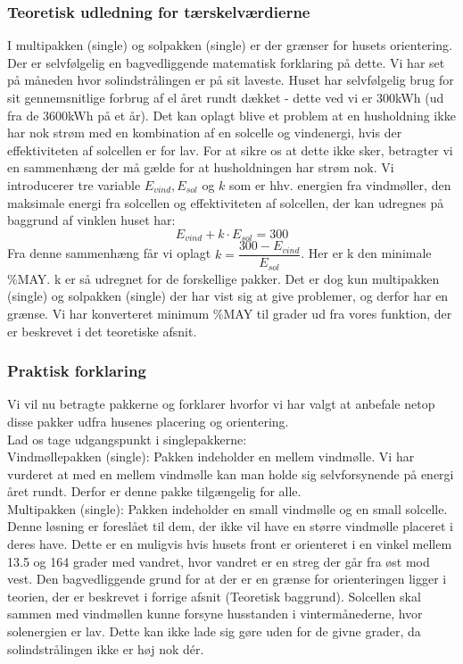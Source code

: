 \documentclass[12pt,a4paper]{article}
\theoremstyle{break}
\theoremstyle{nonumberplain}
\begin{document}
\subsubsection{Teoretisk udledning for tærskelværdierne}

I multipakken (single) og solpakken (single) er der grænser for husets orientering. 
Der er selvfølgelig en bagvedliggende matematisk forklaring på dette. 
Vi har set på måneden hvor solindstrålingen er på sit laveste. Huset har selvfølgelig brug for sit gennemsnitlige forbrug af el året rundt dækket - dette ved vi er 300kWh (ud fra de 3600kWh på et år). 
Det kan oplagt blive et problem at en husholdning ikke har nok strøm med en kombination af en solcelle og vindenergi, hvis der effektiviteten af solcellen er for lav. 
For at sikre os at dette ikke sker, betragter vi en sammenhæng der må gælde for at husholdningen har strøm nok. Vi introducerer tre variable $E_{vind},E_{sol}$ og $k$ som er hhv. energien fra vindmøller, den maksimale energi fra solcellen og effektiviteten af solcellen, der kan udregnes på baggrund af vinklen huset har:
$$E_{vind}+k\cdot E_{sol} = 300$$
Fra denne sammenhæng får vi oplagt
$k = \dfrac{300-E_{vind}}{E_{sol}}$. 
Her er k den minimale \%MAY. k er så udregnet for de forskellige pakker. Det er dog kun multipakken (single) og solpakken (single) der har vist sig at give problemer, og derfor har en grænse. Vi har konverteret minimum \%MAY til grader ud fra vores funktion, der er beskrevet i det teoretiske afsnit.

\subsubsection{Praktisk forklaring}
Vi vil nu betragte pakkerne og forklarer hvorfor vi har valgt at anbefale netop disse pakker udfra husenes placering og orientering. 
\\
Lad os tage udgangspunkt i singlepakkerne:
\\

Vindmøllepakken (single): Pakken indeholder en mellem vindmølle. Vi har vurderet at med en mellem vindmølle kan man holde sig selvforsynende på energi året rundt. Derfor er denne pakke tilgængelig for alle. 
\\

Multipakken (single): Pakken indeholder en small vindmølle og en small solcelle. Denne løsning er foreslået til dem, der ikke vil have en større vindmølle placeret i deres have. Dette er en muligvis hvis husets front er orienteret i en vinkel mellem 13.5 og 164 grader med vandret, hvor vandret er en streg der går fra øst mod vest. Den bagvedliggende grund for at der er en grænse for orienteringen ligger i teorien, der er beskrevet i forrige afsnit (Teoretisk baggrund). Solcellen skal sammen med vindmøllen kunne forsyne husstanden i vintermånederne, hvor solenergien er lav. Dette kan ikke lade sig gøre uden for de givne grader, da solindstrålingen ikke er høj nok dér. 
\\
\end{document}
